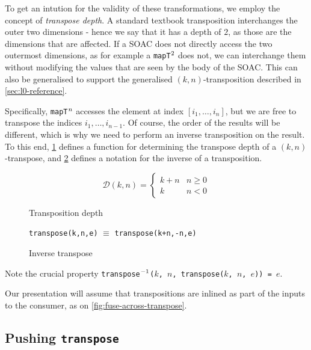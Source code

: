 To get an intution for the validity of these transformations, we
employ the concept of \textit{transpose depth}.  A standard textbook
transposition interchanges the outer two dimensions - hence we say
that it has a depth of $2$, as those are the dimensions that are
affected.  If a SOAC does not directly access the two outermost
dimensions, as for example a \texttt{mapT$^{2}$} does not, we
can interchange them without modifying the values that are seen by the
body of the SOAC.  This can also be generalised to support the
generalised $(k,n)$-transposition described in \cref{sec:l0-reference}.

Specifically, \texttt{mapT$^{n}$} accesses the element at index
\([i_{1}, \ldots, i_{n}]\), but we are free to transpose the indices
$i_{1}, \ldots, i_{n-1}$.  Of course, the order of the results will be
different, which is why we need to perform an inverse transposition on
the result.  To this end, \cref{fig:depth-of-transpose} defines a
function for determining the transpose depth of a $(k,n)$-transpose,
and \cref{fig:inverse-transpose} defines a notation for the inverse of
a transposition.

\begin{figure}
\begin{center}
  \[
  \mathcal{D}(k,n) =
  \begin{cases}
    k+n & n \geq 0\\
    k   & n < 0
  \end{cases}
  \]
\end{center}
\caption{Transposition depth}
\label{fig:depth-of-transpose}
\end{figure}
\begin{figure}
\begin{center}
\texttt{transpose(k,n,e)} $\equiv$ \texttt{transpose(k+n,-n,e)}
\end{center}
\caption{Inverse transpose}
\label{fig:inverse-transpose}
\end{figure}

Note the crucial property \texttt{transpose\(^{-1}\)($k$, $n$,
  transpose($k$, $n$, $e$))~=~$e$}.

Our presentation will assume that transpositions are inlined as part
of the inputs to the consumer, as on \cref{fig:fuse-across-transpose}.

\subsection{Pushing \texttt{transpose}}

